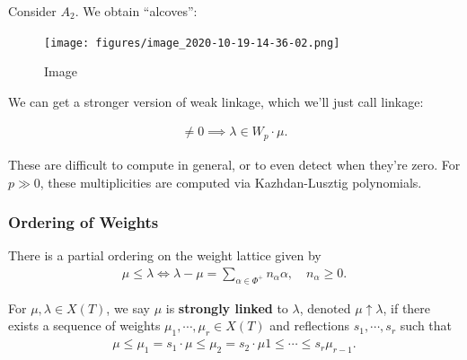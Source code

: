 \begin{example}

Consider \(A_2\). We obtain ``alcoves'':

\begin{figure}
\centering
\texttt{[image: figures/image\_2020-10-19-14-36-02.png]}
\caption{Image}
\end{figure}

\end{example}

We can get a stronger version of weak linkage, which we'll just call
linkage:

\begin{theorem}[Linkage]

\begin{align*}  
[H^0(\lambda): L(\mu)] \neq 0 \implies \lambda \in W_p \cdot \mu
.\end{align*}

\end{theorem}

\begin{warning}

These are difficult to compute in general, or to even detect when
they're zero. For \(p\gg 0\), these multiplicities are computed via
Kazhdan-Lusztig polynomials.

\end{warning}

\hypertarget{ordering-of-weights}{%
\subsubsection{Ordering of Weights}\label{ordering-of-weights}}

There is a partial ordering on the weight lattice given by
\begin{align*}  
\mu \leq \lambda \iff \lambda - \mu = \sum_{\alpha\in \Phi^+} n_\alpha \alpha, \quad n_\alpha \geq 0
.\end{align*}

\begin{definition}

For \(\mu, \lambda \in X(T)\), we say \(\mu\) is \textbf{strongly
linked} to \(\lambda\), denoted \(\mu \uparrow \lambda\), if there
exists a sequence of weights \(\mu_1, \cdots, \mu_r \in X(T)\) and
reflections \(s_1, \cdots, s_r\) such that
\begin{align*}  
\mu \leq \mu_1 = s_1 \cdot \mu \leq \mu_2 = s_2\cdot \mu 1 \leq \cdots \leq s_r \mu_{r-1}
.\end{align*}

\end{definition}

